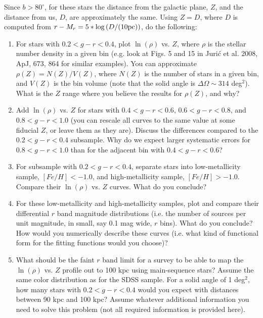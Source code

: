 Since $b>80^\circ$, for these stars the distance from the galactic plane, $Z$,
and the distance from us, $D$, are approximately the same. Using $Z=D$, where
$D$ is computed from $r-M_r= 5*\log{\left(D/({\rm 10 pc})\right)}$, do the following:
\begin{enumerate}
\item For stars with $0.2<g-r<0.4$, plot $\ln(\rho)$ vs. $Z$, where 
  $\rho$ is the stellar number density in a given bin (e.g. look at 
  Figs. 5 and 15 in Juri\'{c} et al. 2008, ApJ, 673, 864 for similar
  examples). You can approximate
  $\rho(Z) = N(Z)/V(Z)$, where $N(Z)$ is the number of stars in a given
  bin, and $V(Z)$ is the bin volume (note that the solid angle is 
  $\Delta \Omega \sim 314$ deg$^2$). What is the $Z$ range where you
  believe the results for  $\rho(Z)$, and why?
\item Add $\ln(\rho)$ vs. $Z$ for stars with $0.4<g-r<0.6$, $0.6<g-r<0.8$,
      and $0.8<g-r<1.0$ (you can rescale all curves to the same value
      at some fiducial $Z$, or leave them as they are). Discuss the 
      differences compared to the $0.2<g-r<0.4$ subsample. Why do we
      expect larger systematic errors for $0.8<g-r<1.0$ than for the
      adjacent bin with $0.4<g-r<0.6$?
\item For subsample with $0.2<g-r<0.4$, separate stars into low-metallicity
      sample, $[Fe/H]<-1.0$, and high-metallicity sample, $[Fe/H]>-1.0$. 
      Compare their $\ln(\rho)$ vs. $Z$ curves. What do you conclude?
\item For these low-metallicity and high-metallicity samples, plot and 
      compare their differential $r$ band magnitude distributions (i.e. the 
      number of sources per unit magnitude, in small, say 0.1 mag wide, $r$
      bins). What do you conclude? How would you numerically describe 
      these curves (i.e. what kind of functional form for the fitting
      functions would you choose)? 
\item What should be the faint $r$ band limit for a survey to be able to
      map the $\ln(\rho)$ vs. $Z$ profile out to 100 kpc using main-sequence
      stars? Assume the same color distribution as for the SDSS sample. 
      For a solid angle of 1 deg$^2$, how many stars with $0.2<g-r<0.4$
      would you expect with distances between 90 kpc and 100 kpc? 
      Assume whatever additional information you need to solve this 
      problem (not all required information is provided here).
\end{enumerate}





